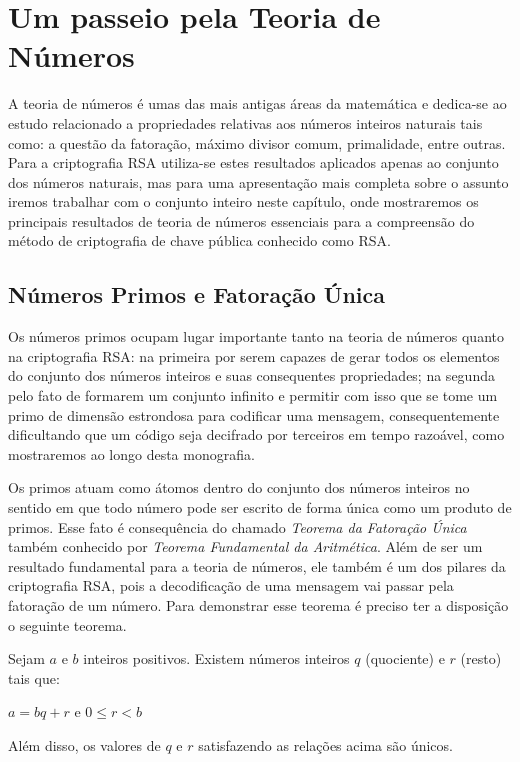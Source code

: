 \pagestyle{fancy}
\fancyhead[R]{\thepage}
\fancyfoot[C]{}


\chapter{Um passeio pela Teoria de N\'umeros}
\label{Num}

A teoria de n\'umeros \'e umas das mais antigas \'areas da matem\'atica e dedica-se ao estudo relacionado a propriedades relativas aos n\'umeros inteiros naturais tais como: a quest\~ao da fatora\c{c}\~ao, m\'aximo divisor comum, primalidade, entre outras. Para a criptografia RSA utiliza-se estes resultados aplicados apenas ao conjunto dos n\'umeros naturais, mas para uma apresenta\c{c}\~ao mais completa sobre o assunto iremos trabalhar com o conjunto inteiro neste cap\'itulo, onde mostraremos os principais resultados de teoria de n\'umeros essenciais para a compreens\~ao do m\'etodo de criptografia de chave p\'ublica conhecido como RSA.

\section{N\'umeros Primos e Fatora\c{c}\~ao \'Unica}

Os n\'umeros primos ocupam lugar importante tanto na teoria de n\'umeros quanto na criptografia RSA: na primeira por serem capazes de gerar todos os elementos do conjunto dos n\'umeros inteiros e suas consequentes propriedades; na segunda pelo fato de formarem um conjunto infinito e permitir com isso que se tome um primo de dimens\~ao estrondosa para codificar uma mensagem, consequentemente dificultando que um c\'odigo seja decifrado por terceiros em tempo razo\'avel, como mostraremos ao longo desta monografia.

Os primos atuam como \'atomos dentro do conjunto dos n\'umeros inteiros no sentido em que todo n\'umero pode ser escrito de forma 
\'{u}nica como um produto de primos. Esse fato \'e consequ\^encia do chamado \textit{Teorema da Fatora\c{c}\~ao \'Unica} tamb\'em conhecido por \textit{Teorema Fundamental da Aritm\'etica}. Al\'em de ser um resultado fundamental para a teoria de n\'umeros, ele tamb\'em \'e um dos pilares da criptografia RSA, pois a decodifica\c{c}\~ao de uma mensagem vai passar pela fatora\c{c}\~ao de um n\'umero. Para demonstrar esse teorema \'e preciso ter a disposi\c{c}\~ao o seguinte teorema. 


\begin{Th}
\label{teo.div}
Sejam $a$ e $b$ inteiros positivos. Existem n\'umeros inteiros $q$ (quociente) e $r$ (resto) tais que:	
	\begin{center}
		$a=bq+r$ e $0\leq r <b$
	\end{center}
Al\'em disso, os valores de $q$ e $r$ satisfazendo as rela\c{c}\~oes acima s\~ao \'unicos.
\end{Th} 

